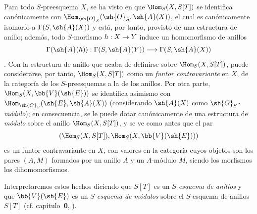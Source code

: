\documentclass[oneside,10pt]{amsart}
\makeatletter
\newcommand{\ega@arrow}[2]{\mathchoice{#1}{#2}{#2}{#2}}
\renewcommand{\to}{\ega@arrow{\longrightarrow}{\rightarrow}}
\let\EGAOriginalLabel\label
\renewcommand{\label}[1]{\phantomsection\EGAOriginalLabel{#1}}
\makeatother
\begin{document}
\begin{env}[1.7.13]
\label{II.1.7.13}
Para todo $S$-preesquema $X$, se ha visto en  que $\Hom_S(X,S[T])$ se identifica canónicamente con $\Hom_{\sh{O}_S}(\sh{O}_S,\sh{A}(X))$, el cual es canónicamente isomorfo a $\Gamma(S,\sh{A}(X))$ y está, por tanto, provisto de una estructura de anillo; además, todo $S$-morfismo $h:X\to Y$ induce un homomorfismo de anillos
\[
  \Gamma(\sh{A}(h)):\Gamma(S,\sh{A}(Y))\to\Gamma(S,\sh{A}(X))
\]
.
Con la estructura de anillo que acaba de definirse sobre $\Hom_S(X,S[T])$, puede considerarse, por tanto, $\Hom_S(X,S[T])$ como un \emph{funtor contravariante} en $X$, de la categoría de los $S$-preesquemas a la de los anillos.
Por otra parte, $\Hom_S(X,\bb{V}(\sh{E}))$ se identifica asimismo con $\Hom_{\sh{O}_S}(\sh{E},\sh{A}(X))$ (considerando $\sh{A}(X)$ como \emph{$\sh{O}_S$-módulo}); en consecuencia, se le puede dotar canónicamente de una estructura de \emph{módulo} sobre el anillo $\Hom_S(X,S[T])$, y se ve como antes que el par
\[
  (\Hom_S(X,S[T]),\Hom_S(X,\bb{V}(\sh{E})))
\]
es un funtor contravariante en $X$, con valores en la categoría cuyos objetos son los pares $(A,M)$ formados por un anillo $A$ y un $A$-módulo $M$, siendo los morfismos los dihomomorfismos.

Interpretaremos estos hechos diciendo que $S[T]$ es un \emph{$S$-esquema de anillos} y que $\bb{V}(\sh{E})$ es un \emph{$S$-esquema de módulos} sobre el $S$-esquema de anillos $S[T]$ (cf. capítulo~\textbf 0, ).
\end{env}
\end{document}

